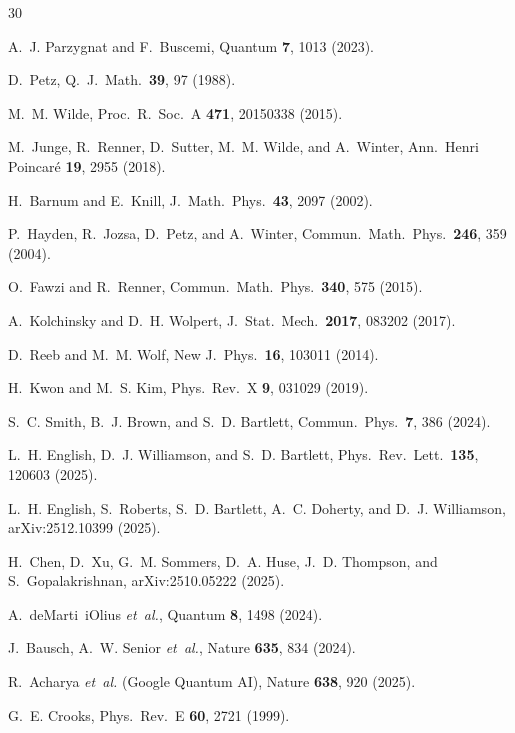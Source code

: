 \documentclass[prl,twocolumn,superscriptaddress,longbibliography]{revtex4-2}
\begin{document}
\begin{thebibliography}{30}

A.~J. Parzygnat and F.~Buscemi,
Quantum \textbf{7}, 1013 (2023).

D.~Petz,
Q.\ J.\ Math.\ \textbf{39}, 97 (1988).

M.~M. Wilde,
Proc.\ R.\ Soc.\ A \textbf{471}, 20150338 (2015).

M.~Junge, R.~Renner, D.~Sutter, M.~M. Wilde, and A.~Winter,
Ann.\ Henri Poincar\'e \textbf{19}, 2955 (2018).

H.~Barnum and E.~Knill,
J.\ Math.\ Phys.\ \textbf{43}, 2097 (2002).

P.~Hayden, R.~Jozsa, D.~Petz, and A.~Winter,
Commun.\ Math.\ Phys.\ \textbf{246}, 359 (2004).

O.~Fawzi and R.~Renner,
Commun.\ Math.\ Phys.\ \textbf{340}, 575 (2015).

A.~Kolchinsky and D.~H. Wolpert,
J.\ Stat.\ Mech.\ \textbf{2017}, 083202 (2017).

D.~Reeb and M.~M. Wolf,
New J.\ Phys.\ \textbf{16}, 103011 (2014).

H.~Kwon and M.~S. Kim,
Phys.\ Rev.\ X \textbf{9}, 031029 (2019).

S.~C. Smith, B.~J. Brown, and S.~D. Bartlett,
Commun.\ Phys.\ \textbf{7}, 386 (2024).

L.~H. English, D.~J. Williamson, and S.~D. Bartlett,
Phys.\ Rev.\ Lett.\ \textbf{135}, 120603 (2025).

L.~H. English, S.~Roberts, S.~D. Bartlett, A.~C. Doherty,
and D.~J. Williamson,
arXiv:2512.10399 (2025).

H.~Chen, D.~Xu, G.~M. Sommers, D.~A. Huse, J.~D. Thompson,
and S.~Gopalakrishnan,
arXiv:2510.05222 (2025).

A.~deMarti~iOlius \emph{et~al.},
Quantum \textbf{8}, 1498 (2024).

J.~Bausch, A.~W. Senior \emph{et~al.},
Nature \textbf{635}, 834 (2024).

R.~Acharya \emph{et~al.} (Google Quantum AI),
Nature \textbf{638}, 920 (2025).

G.~E. Crooks,
Phys.\ Rev.\ E \textbf{60}, 2721 (1999).


\end{thebibliography}
\end{document}
